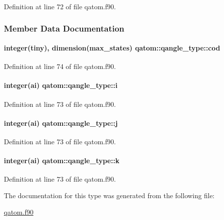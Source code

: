 Definition at line 72 of file qatom.\-f90.



\subsubsection{Member Data Documentation}
\hypertarget{structqatom_1_1qangle__type_afb3fd11cfc8dd8ea2cb588564a86dd83}{
\paragraph[{cod}]{\setlength{\rightskip}{0pt plus 5cm}integer(tiny), dimension({\bf max\-\_\-states}) qatom\-::qangle\-\_\-type\-::cod}}\label{structqatom_1_1qangle__type_afb3fd11cfc8dd8ea2cb588564a86dd83}


Definition at line 74 of file qatom.\-f90.

\hypertarget{structqatom_1_1qangle__type_a2a83ac16d6c3ef6b066b4ae6a0796bb7}{
\paragraph[{i}]{\setlength{\rightskip}{0pt plus 5cm}integer(ai) qatom\-::qangle\-\_\-type\-::i}}\label{structqatom_1_1qangle__type_a2a83ac16d6c3ef6b066b4ae6a0796bb7}


Definition at line 73 of file qatom.\-f90.

\hypertarget{structqatom_1_1qangle__type_ac51adae027ccd9fcd86bb2604f2ee9f7}{
\paragraph[{j}]{\setlength{\rightskip}{0pt plus 5cm}integer(ai) qatom\-::qangle\-\_\-type\-::j}}\label{structqatom_1_1qangle__type_ac51adae027ccd9fcd86bb2604f2ee9f7}


Definition at line 73 of file qatom.\-f90.

\hypertarget{structqatom_1_1qangle__type_a4c48768a4290e30094749685513e21c2}{
\paragraph[{k}]{\setlength{\rightskip}{0pt plus 5cm}integer(ai) qatom\-::qangle\-\_\-type\-::k}}\label{structqatom_1_1qangle__type_a4c48768a4290e30094749685513e21c2}


Definition at line 73 of file qatom.\-f90.



The documentation for this type was generated from the following file\-:\begin{DoxyCompactItemize}
\item 
\hyperlink{qatom_8f90}{qatom.\-f90}\end{DoxyCompactItemize}
